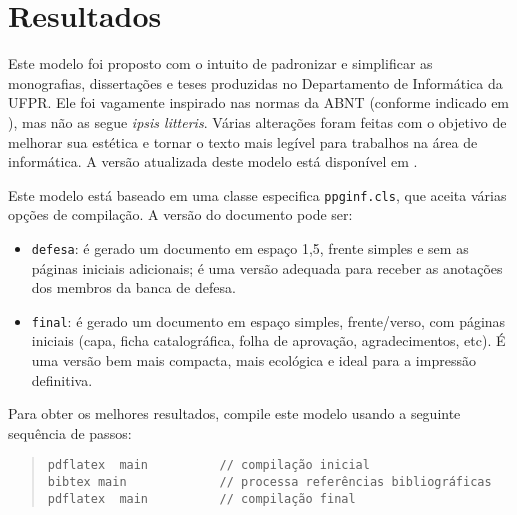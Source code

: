 \chapter{Resultados}



Este modelo foi proposto com o intuito de padronizar e simplificar as monografias, dissertações e teses produzidas no Departamento de Informática da UFPR. Ele foi vagamente inspirado nas normas da ABNT (conforme indicado em \cite{bibufpr15}), mas não as segue \emph{ipsis litteris}. Várias alterações foram feitas com o objetivo de melhorar sua estética e tornar o texto mais legível para trabalhos na área de informática. A versão atualizada deste modelo está disponível em \cite{maziero15}.

Este modelo está baseado em uma classe especifica \verb#ppginf.cls#, que aceita várias opções de compilação. A versão do documento pode ser:

\begin{itemize}

\item \verb#defesa#: é gerado um documento em espaço 1,5, frente simples e sem as páginas iniciais adicionais; é uma versão adequada para receber as anotações dos membros da banca de defesa.

\item \verb#final#: é gerado um documento em espaço simples, frente/verso, com páginas iniciais (capa, ficha catalográfica, folha de aprovação, agradecimentos, etc). É uma versão bem mais compacta, mais ecológica e ideal para a impressão definitiva.

\end{itemize}

Para obter os melhores resultados, compile este modelo usando a seguinte sequência de passos:

\begin{quote}
\begin{footnotesize}
\begin{verbatim}
pdflatex  main          // compilação inicial
bibtex main             // processa referências bibliográficas
pdflatex  main          // compilação final
\end{verbatim}
\end{footnotesize}
\end{quote}

